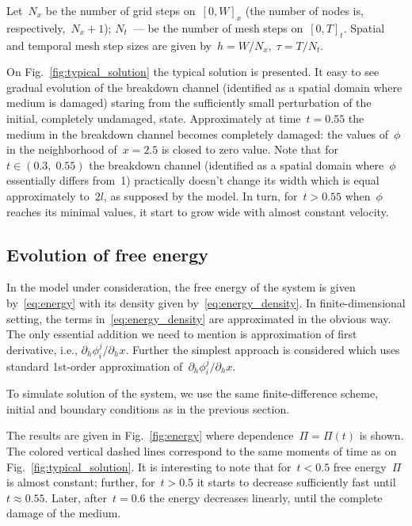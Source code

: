 Let~$N_x$ be the number of grid steps on~$[0, W]_x$ (the number of
nodes is, respectively,~$N_x + 1$);
$N_t$~--- be the number of mesh steps on~$[0, T]_t$.
Spatial and temporal mesh step sizes are given by~$h = W / N_x, \; \tau = T / N_t$.

On Fig.~\ref{fig:typical_solution} the typical solution is presented.
It easy to see gradual evolution of the breakdown channel
(identified as a spatial domain where medium is damaged)
staring from the sufficiently small perturbation
of the initial, completely undamaged, state.
Approximately at time~$t = 0.55$ the medium in the breakdown channel
becomes completely damaged: the values of~$\phi$ in the neighborhood
of~$x = 2.5$
is closed to zero value.
Note that for~$t \in (0.3, \; 0.55)$ the breakdown channel
(identified as a spatial domain where~$\phi$ essentially differs from~1)
practically doesn't change its width which is equal approximately
to~$2l$, as supposed by the model. In turn, for~$t > 0.55$
when~$\phi$  reaches its minimal values, it start to
grow wide with almost constant velocity.


\subsection{Evolution of free energy}

In the model under consideration, the free energy of the system is given
by~\eqref{eq:energy} with its density given by~\eqref{eq:energy_density}.
In finite-dimensional setting, the terms in~\eqref{eq:energy_density}
are approximated in the obvious way. 
The only essential addition we need to mention is approximation of
first derivative, i.e., 
$\partial_h \phi_i^j / \partial_h x$.
Further the simplest approach is considered which uses standard
1st-order approximation of~$\partial_h \phi_i^j / \partial_h x$.

To simulate solution of the system, we use the same
finite-difference scheme, initial and boundary conditions as in the
previous section.

The results are given in Fig.~\ref{fig:energy} where
dependence~$\Pi = \Pi(t)$ is shown.
The colored vertical dashed lines correspond to the same moments of time as on Fig.~\ref{fig:typical_solution}. 
It is interesting to note that for~$t < 0.5$ free energy~$\Pi$ is
almost constant; further, for~$t > 0.5$ it starts to decrease
sufficiently fast until~$t \approx 0.55$. Later, after~$t = 0.6$ the
energy decreases linearly, until the complete damage of the medium.

